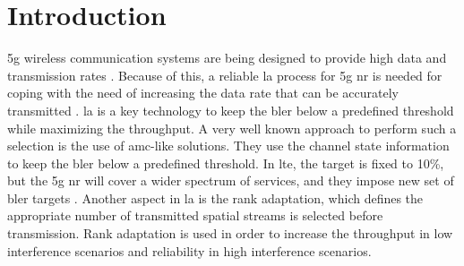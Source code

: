 %

\chapter{Introduction} \label{chp:introduction}
\Gls{5g} wireless communication systems are being designed to provide high data and transmission rates \cite{Amin_2016}.
%
Because of this, a reliable \gls{la} process for \gls{5g} \gls{nr} is needed for coping with the need of increasing the data rate that can be accurately transmitted \cite{chu01}.
%
\Gls{la} is a key technology to keep the \gls{bler} below a predefined threshold while maximizing the throughput.
%
%
%
A very well known approach to perform such a selection is the use of \gls{amc}-like solutions.
%
They use the channel state information to keep the \gls{bler} below a predefined threshold.
%
In \gls{lte}, the target is fixed to 10\%, but the \gls{5g} \gls{nr} will cover a wider spectrum of services, and they impose new set of \gls{bler} targets \cite{Amin_2016,fantacci2009adaptive}.
%
Another aspect in \gls{la} is the rank adaptation, which defines the appropriate number of transmitted spatial streams is selected before transmission.
%
Rank adaptation is used in order to increase the throughput in low interference scenarios and reliability in high interference scenarios.

%
%

